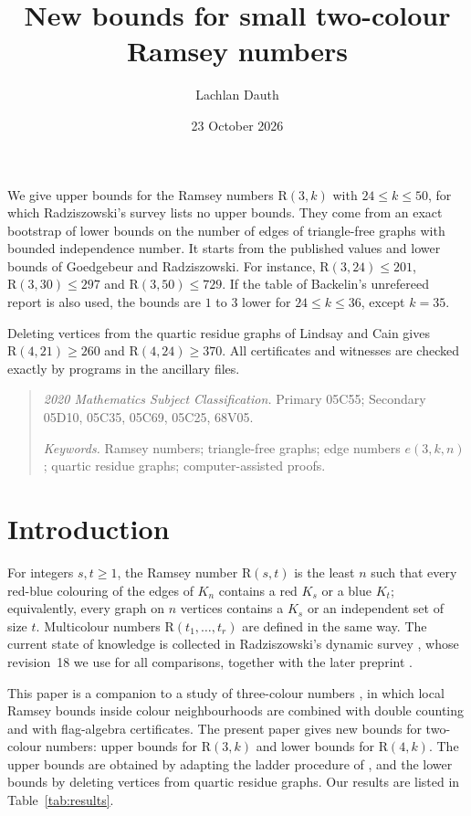 \documentclass[11pt]{article}
\title{New bounds for small two-colour Ramsey numbers}
\author{Lachlan Dauth}
\date{23 October 2026}
\renewenvironment{abstract}{\small\begin{center}\bfseries\abstractname\end{center}%
  \list{}{\setlength{\leftmargin}{2.5em}\setlength{\rightmargin}{\leftmargin}%
  \setlength{\listparindent}{0pt}\setlength{\parsep}{0.6em plus 1pt}\setlength{\topsep}{0pt}}\item\relax}{\endlist}
\theoremstyle{spacedplain}
\theoremstyle{spaceddef}
\theoremstyle{spacedremark}
\newcommand{\R}{\mathrm{R}}
\begin{document}
\maketitle

\begin{abstract}
We give upper bounds for the Ramsey numbers $\R(3,k)$ with $24\le k\le 50$, for which Radziszowski's survey lists no upper bounds.
They come from an exact bootstrap of lower bounds on the number of edges of triangle-free graphs with bounded independence number.
It starts from the published values and lower bounds of Goedgebeur and Radziszowski.
For instance, $\R(3,24)\le 201$, $\R(3,30)\le 297$ and $\R(3,50)\le 729$.
If the table of Backelin's unrefereed report is also used, the bounds are $1$ to $3$ lower for $24\le k\le 36$, except $k=35$.

Deleting vertices from the quartic residue graphs of Lindsay and Cain gives $\R(4,21)\ge 260$ and $\R(4,24)\ge 370$.
All certificates and witnesses are checked exactly by programs in the ancillary files.
\end{abstract}

\begin{quote}\small
\textit{2020 Mathematics Subject Classification.} Primary 05C55; Secondary 05D10, 05C35, 05C69, 05C25, 68V05.

\textit{Keywords.} Ramsey numbers; triangle-free graphs; edge numbers $e(3,k,n)$; quartic residue graphs; computer-assisted proofs.
\end{quote}

\section{Introduction}

For integers $s,t\ge 1$, the Ramsey number $\R(s,t)$ is the least $n$ such that every red-blue colouring of the edges of $K_n$ contains a red $K_s$ or a blue $K_t$; equivalently, every graph on $n$ vertices contains a $K_s$ or an independent set of size $t$.
Multicolour numbers $\R(t_1,\dots,t_r)$ are defined in the same way.
The current state of knowledge is collected in Radziszowski's dynamic survey \cite{Rad26}, whose revision~18 we use for all comparisons, together with the later preprint \cite{Yu26}.

This paper is a companion to a study of three-colour numbers \cite{DC26}, in which local Ramsey bounds inside colour neighbourhoods are combined with double counting and with flag-algebra certificates.
The present paper gives new bounds for two-colour numbers: upper bounds for $\R(3,k)$ and lower bounds for $\R(4,k)$.
The upper bounds are obtained by adapting the ladder procedure of \cite[Section~5]{DC26}, and the lower bounds by deleting vertices from quartic residue graphs.
Our results are listed in Table~\ref{tab:results}.
\end{document}
